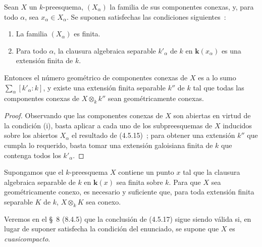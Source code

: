 \begin{corollary}[4.5.16]
\label{IV.2.4.5.16-fr}
Sean $X$ un $k$-preesquema, $(X_\alpha)$ la familia de sus componentes conexas,
y, para todo $\alpha$, sea $x_\alpha\in X_\alpha$. Se suponen satisfechas las
condiciones siguientes~:
\begin{enumerate}
\item[\textup{(i)}] La familia $(X_\alpha)$ es finita.
\item[\textup{(ii)}] Para todo $\alpha$, la clausura algebraica separable $k'_\alpha$
de $k$ en $\boldsymbol{k}(x_\alpha)$ es una extensión finita de $k$.
\end{enumerate}
Entonces el número geométrico de componentes conexas de $X$ es a lo sumo
$\sum_\alpha[k'_\alpha:k]$, y existe una extensión finita separable $k''$ de
$k$ tal que todas las componentes conexas de $X\otimes_k k''$ sean
geométricamente conexas.
\end{corollary}

\begin{proof}
Observando que las componentes conexas de $X$ son abiertas en virtud de la
condición (i), basta aplicar a cada uno de los subpreesquemas de $X$ inducidos
sobre los abiertos $X_\alpha$ el resultado de (4.5.15)~; para obtener una
extensión $k''$ que cumpla lo requerido, basta tomar una extensión galoisiana
finita de $k$ que contenga todos los $k'_\alpha$.
\end{proof}


\begin{corollary}[4.5.17]
\label{IV.2.4.5.17-fr}
Supongamos que el $k$-preesquema $X$ contiene un punto $x$ tal que la clausura
algebraica separable de $k$ en $\boldsymbol{k}(x)$ sea finita sobre $k$. Para que $X$ sea
geométricamente conexo, es necesario y suficiente que, para toda extensión
finita separable $K$ de $k$, $X\otimes_k K$ sea conexo.
\end{corollary}

\begin{remark}[4.5.18]
\label{IV.2.4.5.18-fr}
Veremos en el \S~8 (8.4.5) que la conclusión de (4.5.17) sigue siendo válida
si, en lugar de suponer satisfecha la condición del enunciado, se supone que
$X$ es \emph{cuasicompacto}.
\end{remark}
